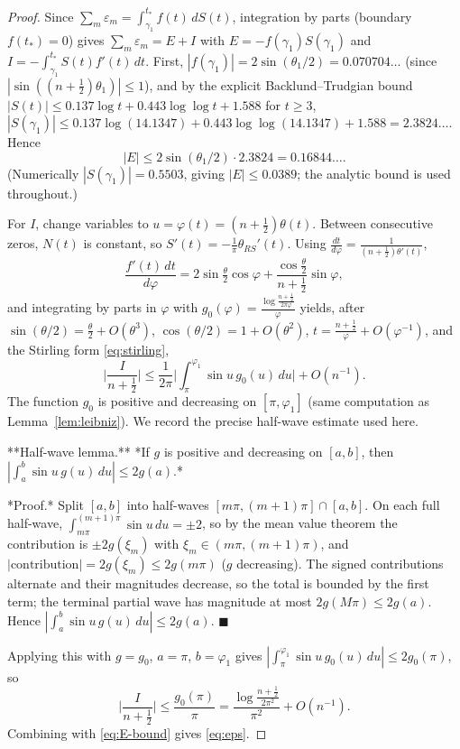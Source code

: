 \documentclass[11pt]{article}
\begin{document}
\begin{proof}
Since $\sum_m\varepsilon_m=\int_{\gamma_1}^{t_*}f(t)\,dS(t)$, integration by parts (boundary
$f(t_*)=0$) gives $\sum_m\varepsilon_m=E+I$ with $E=-f(\gamma_1)S(\gamma_1)$ and
$I=-\int_{\gamma_1}^{t_*}S(t)f'(t)\,dt$. First, $|f(\gamma_1)|=2\sin(\theta_1/2)=0.070704\ldots$
(since $|\sin((n+\tfrac12)\theta_1)|\le1$), and by the explicit Backlund--Trudgian bound \cite{Trudgian}
$|S(t)|\le0.137\log t+0.443\log\log t+1.588$ for $t\ge3$,
$|S(\gamma_1)|\le0.137\log(14.1347)+0.443\log\log(14.1347)+1.588=2.3824\ldots$.
Hence
\begin{equation}\label{eq:E-bound}
|E|\le2\sin(\theta_1/2)\cdot2.3824=0.16844\ldots.
\end{equation}
(Numerically $|S(\gamma_1)|=0.5503$, giving $|E|\le0.0389$; the analytic bound is used
throughout.)

For $I$, change variables to $u=\varphi(t)=(n+\tfrac12)\theta(t)$. Between consecutive
zeros, $N(t)$ is constant, so $S'(t)=-\frac1\pi\theta_{RS}'(t)$. Using
$\frac{dt}{d\varphi}=\frac1{(n+\frac12)\theta'(t)}$,
\[
\frac{f'(t)\,dt}{d\varphi}
=2\sin\tfrac\theta2\cos\varphi+\frac{\cos\tfrac\theta2}{n+\tfrac12}\sin\varphi,
\]
and integrating by parts in $\varphi$ with $g_0(\varphi)=\frac{\log\frac{n+\frac12}{2\pi\varphi}}{\varphi}$
yields, after $\sin(\theta/2)=\tfrac{\theta}{2}+O(\theta^3)$, $\cos(\theta/2)=1+O(\theta^2)$,
$t=\frac{n+\frac12}{\varphi}+O(\varphi^{-1})$, and the Stirling form \eqref{eq:stirling},
\[
\Big|\frac{I}{n+\tfrac12}\Big|\le\frac1{2\pi}\Big|\int_\pi^{\varphi_1}\sin u\,g_0(u)\,du\Big|+O(n^{-1}).
\]
The function $g_0$ is positive and decreasing on $[\pi,\varphi_1]$ (same computation as
Lemma~\ref{lem:leibniz}). We record the precise half-wave estimate used here.

**Half-wave lemma.** *If $g$ is positive and decreasing on $[a,b]$, then
$|\int_a^b\sin u\,g(u)\,du|\le2g(a)$.*

*Proof.* Split $[a,b]$ into half-waves $[m\pi,(m+1)\pi]\cap[a,b]$. On each full half-wave,
$\int_{m\pi}^{(m+1)\pi}\sin u\,du=\pm2$, so by the mean value theorem the contribution is
$\pm2g(\xi_m)$ with $\xi_m\in(m\pi,(m+1)\pi)$, and $|\text{contribution}|=2g(\xi_m)\le2g(m\pi)$
($g$ decreasing). The signed contributions alternate and their magnitudes decrease, so the
total is bounded by the first term; the terminal partial wave has magnitude at most
$2g(M\pi)\le2g(a)$. Hence $|\int_a^b\sin u\,g(u)\,du|\le2g(a)$. $\blacksquare$

Applying this with $g=g_0$, $a=\pi$, $b=\varphi_1$ gives
$|\int_\pi^{\varphi_1}\sin u\,g_0(u)\,du|\le2g_0(\pi)$, so
\[
\Big|\frac{I}{n+\tfrac12}\Big|\le\frac{g_0(\pi)}{\pi}
=\frac{\log\frac{n+\frac12}{2\pi^2}}{\pi^2}+O(n^{-1}).
\]
Combining with \eqref{eq:E-bound} gives \eqref{eq:eps}.
\end{proof}
\end{document}
